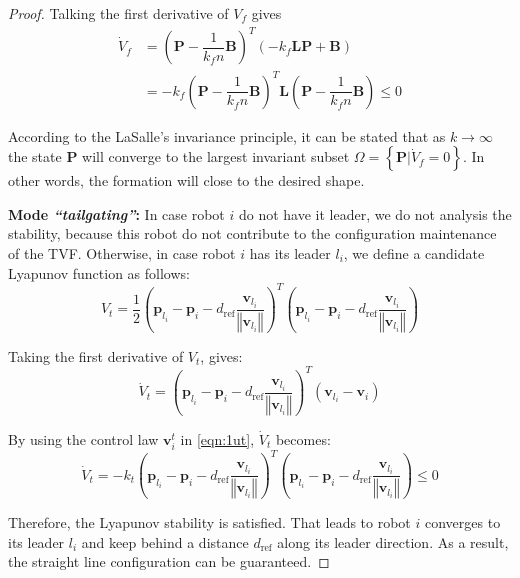 \begin{proof}
Talking the first derivative of $V_f$ gives
\begin{equation}
\begin{aligned}
    \dot{V}_f&=\left(\mathbf{P}-\dfrac{1}{k_fn}\mathbf{B}\right)^T\left(-k_f\mathbf{L}\mathbf{P}+\mathbf{B}\right)\\
    &=-k_f\left(\mathbf{P}-\dfrac{1}{k_fn}\mathbf{B}\right)^T\mathbf{L}\left(\mathbf{P}-\dfrac{1}{k_fn}\mathbf{B}\right)\leq0
\end{aligned}
\end{equation}

According to the LaSalle’s invariance
principle, it can be stated that as $k\to\infty$ the state $\mathbf{P}$ will converge to the largest invariant subset $\Omega=\left\{\mathbf{P}|\dot{V}_f=0\right\}$. In other words, the formation will close to the desired shape.

\textbf{Mode \textit{``tailgating''}:} In case robot $i$ do not have it leader, we do not analysis the stability, because this robot do not contribute to the configuration maintenance of the TVF. Otherwise, in case robot $i$ has its leader $l_i$, we define a candidate Lyapunov function as follows:
\begin{equation}
    V_{t}=\dfrac{1}{2}\left(\mathbf{p}_{l_i}-\mathbf{p}_{i}-d_\text{ref}\dfrac{\mathbf{v}_{l_i}}{\left\Vert \mathbf{v}_{l_i}\right\Vert}\right)^{T}\left(\mathbf{p}_{l_i}-\mathbf{p}_{i}-d_\text{ref}\dfrac{\mathbf{v}_{l_i}}{\left\Vert \mathbf{v}_{l_i}\right\Vert}\right)
\end{equation}

Taking the first derivative of $V_t$, gives:
\begin{equation}
    \dot{V}_{t}=\left(\mathbf{p}_{l_i}-\mathbf{p}_{i}-d_\text{ref}\dfrac{\mathbf{v}_{l_i}}{\left\Vert \mathbf{v}_{l_i}\right\Vert}\right)^{T}\left(\mathbf{v}_{l_i}-\mathbf{v}_{i}\right)
\end{equation}

By using the control law $\mathbf{v}^t_i$ in \eqref{eqn:1ut}, $\dot{V}_t$ becomes:
\begin{equation}
    \dot{V}_{t}=-k_{t}\left(\mathbf{p}_{l_i}-\mathbf{p}_{i}-d_\text{ref}\dfrac{\mathbf{v}_{l_i}}{\left\Vert \mathbf{v}_{l_i}\right\Vert}\right)^{T}\left(\mathbf{p}_{l_i}-\mathbf{p}_{i}-d_\text{ref}\dfrac{\mathbf{v}_{l_i}}{\left\Vert \mathbf{v}_{l_i}\right\Vert}\right)\leq0
\end{equation}

Therefore, the Lyapunov stability is satisfied. That leads to robot $i$ converges to its leader $l_i$ and keep behind a distance $d_\text{ref}$ along its leader direction. As a result, the straight line configuration can be guaranteed.
\end{proof}

